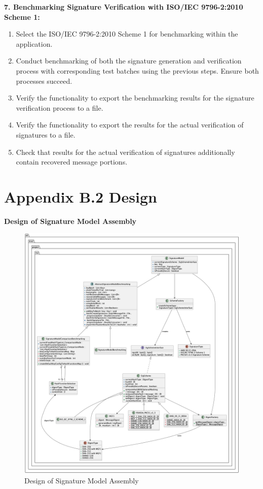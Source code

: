 \documentclass[]{final_report}
\theoremstyle{definition}
\begin{document}
\textbf{7. Benchmarking Signature Verification with ISO/IEC 9796-2:2010 Scheme 1:}
\begin{enumerate}
\item Select the ISO/IEC 9796-2:2010 Scheme 1 for benchmarking within the application.
\item Conduct benchmarking of both the signature generation and verification process with corresponding test batches using the previous steps. Ensure both processes succeed.
\item Verify the functionality to export the benchmarking results for the signature verification process to a file.
\item Verify the functionality to export the results for the actual verification of signatures to a file.
\item Check that results for the actual verification of signatures additionally contain recovered message portions.
\end{enumerate}


\section{Appendix B.2 Design}

\textbf{Design of Signature Model Assembly}
\begin{figure}[H]
    \centering
    \includegraphics[scale=0.335]{main_pictures/signatureModel.png}
    \caption{Design of Signature Model Assembly}
    \label{fig:SIGMODDESIGN}
\end{figure}
\end{document}
